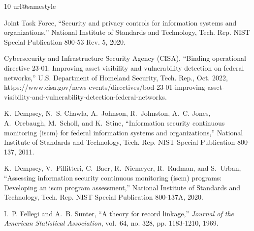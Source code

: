 \documentclass[journal]{IEEEtran}
\begin{document}
\begin{thebibliography}{10}
\providecommand{\url}[1]{#1}
\csname url@samestyle\endcsname
\providecommand{\newblock}{\relax}
\providecommand{\bibinfo}[2]{#2}
\providecommand{\BIBentrySTDinterwordspacing}{\spaceskip=0pt\relax}
\providecommand{\BIBentryALTinterwordstretchfactor}{4}
\providecommand{\BIBentryALTinterwordspacing}{\spaceskip=\fontdimen2\font plus
\BIBentryALTinterwordstretchfactor\fontdimen3\font minus
  \fontdimen4\font\relax}
\providecommand{\BIBforeignlanguage}[2]{{%
\expandafter\ifx\csname l@#1\endcsname\relax
\typeout{** WARNING: IEEEtran.bst: No hyphenation pattern has been}%
\typeout{** loaded for the language `#1'. Using the pattern for}%
\typeout{** the default language instead.}%
\else
\language=\csname l@#1\endcsname
\fi
#2}}
\providecommand{\BIBdecl}{\relax}
\BIBdecl

{Joint Task Force}, ``Security and privacy controls for information systems and
  organizations,'' National Institute of Standards and Technology, Tech. Rep.
  NIST Special Publication 800-53 Rev. 5, 2020.

{Cybersecurity and Infrastructure Security Agency (CISA)}, ``Binding
  operational directive 23-01: Improving asset visibility and vulnerability
  detection on federal networks,'' U.S. Department of Homeland Security, Tech.
  Rep., Oct. 2022,
  \url{https://www.cisa.gov/news-events/directives/bod-23-01-improving-asset-visibility-and-vulnerability-detection-federal-networks}.

K.~Dempsey, N.~S. Chawla, A.~Johnson, R.~Johnston, A.~C. Jones, A.~Orebaugh,
  M.~Scholl, and K.~Stine, ``Information security continuous monitoring (iscm)
  for federal information systems and organizations,'' National Institute of
  Standards and Technology, Tech. Rep. NIST Special Publication 800-137, 2011.

K.~Dempsey, V.~Pillitteri, C.~Baer, R.~Niemeyer, R.~Rudman, and S.~Urban,
  ``Assessing information security continuous monitoring (iscm) programs:
  Developing an iscm program assessment,'' National Institute of Standards and
  Technology, Tech. Rep. NIST Special Publication 800-137A, 2020.

I.~P. Fellegi and A.~B. Sunter, ``A theory for record linkage,'' \emph{Journal
  of the American Statistical Association}, vol.~64, no. 328, pp. 1183-1210,
  1969.


\end{thebibliography}
\end{document}
